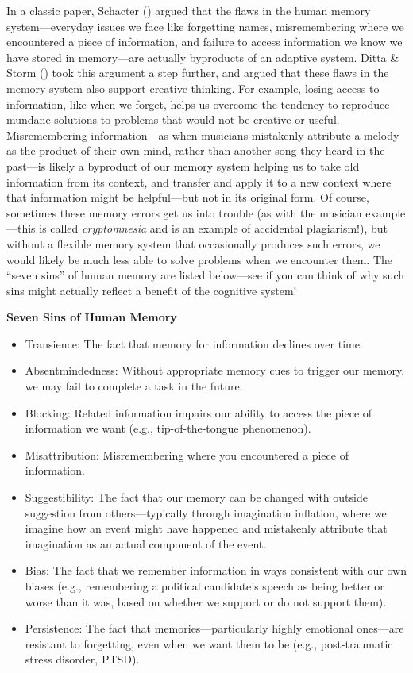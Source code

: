 \documentclass[
]{krantz}
\providecommand{\tightlist}{%
  \setlength{\itemsep}{0pt}\setlength{\parskip}{0pt}}
\begin{document}
In a classic paper, Schacter () argued that the flaws in the human memory system---everyday issues we face like forgetting names, misremembering where we encountered a piece of information, and failure to access information we know we have stored in memory---are actually byproducts of an adaptive system. Ditta \& Storm () took this argument a step further, and argued that these flaws in the memory system also support creative thinking. For example, losing access to information, like when we forget, helps us overcome the tendency to reproduce mundane solutions to problems that would not be creative or useful. Misremembering information---as when musicians mistakenly attribute a melody as the product of their own mind, rather than another song they heard in the past---is likely a byproduct of our memory system helping us to take old information from its context, and transfer and apply it to a new context where that information might be helpful---but not in its original form. Of course, sometimes these memory errors get us into trouble (as with the musician example---this is called \emph{cryptomnesia} and is an example of accidental plagiarism!), but without a flexible memory system that occasionally produces such errors, we would likely be much less able to solve problems when we encounter them. The ``seven sins'' of human memory are listed below---see if you can think of why such sins might actually reflect a benefit of the cognitive system!

\textbf{Seven Sins of Human Memory}

\begin{itemize}
\tightlist
\item
  Transience: The fact that memory for information declines over time.
\item
  Absentmindedness: Without appropriate memory cues to trigger our memory, we may fail to complete a task in the future.
\item
  Blocking: Related information impairs our ability to access the piece of information we want (e.g., tip-of-the-tongue phenomenon).
\item
  Misattribution: Misremembering where you encountered a piece of information.
\item
  Suggestibility: The fact that our memory can be changed with outside suggestion from others---typically through imagination inflation, where we imagine how an event might have happened and mistakenly attribute that imagination as an actual component of the event.
\item
  Bias: The fact that we remember information in ways consistent with our own biases (e.g., remembering a political candidate's speech as being better or worse than it was, based on whether we support or do not support them).
\item
  Persistence: The fact that memories---particularly highly emotional ones---are resistant to forgetting, even when we want them to be (e.g., post-traumatic stress disorder, PTSD).
\end{itemize}
\end{document}
